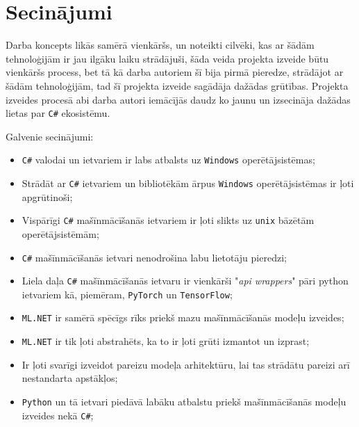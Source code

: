 \section{Secinājumi}

    Darba koncepts likās samērā vienkāršs, un noteikti cilvēki, kas ar šādām tehnoloģijām ir jau
    ilgāku laiku strādājuši, šāda veida projekta izveide būtu vienkāršs process, bet tā kā darba autoriem
    šī bija pirmā pieredze, strādājot ar šādām tehnoloģijām, tad šī projekta izveide sagādāja dažādas
    grūtības. Projekta izveides procesā abi darba autori iemācījās daudz ko jaunu  un izsecināja
    dažādas lietas par \texttt{C\#} ekosistēmu.

    Galvenie secinājumi:
    \begin{itemize}
        \item \texttt{C\#} valodai un ietvariem ir labs atbalsts uz \texttt{Windows} operētājsistēmas;
        \item Strādāt ar \texttt{C\#} ietvariem un bibliotēkām ārpus \texttt{Windows} operētājsistēmas ir ļoti apgrūtinoši;
        \item Vispārīgi \texttt{C\#} mašīnmācīšanās ietvariem ir ļoti slikts uz \texttt{unix} bāzētām operētājsistēmām;
        \item \texttt{C\#} mašīnmācīšanās ietvari nenodrošina labu lietotāju pieredzi;
        \item Liela daļa \texttt{C\#} mašīnmācīšanās ietvaru ir vienkārši "\textit{api wrappers}" pāri python ietvariem kā, piemēram, \texttt{PyTorch} un \texttt{TensorFlow};
        \item \texttt{ML.NET} ir samērā spēcīgs rīks priekš mazu mašīnmācīšanās modeļu izveides;
        \item \texttt{ML.NET} ir tik ļoti abstrahēts, ka to ir ļoti grūti izmantot un izprast;
        \item Ir ļoti svarīgi izveidot pareizu modeļa arhitektūru, lai tas strādātu pareizi arī nestandarta apstākļos;
        \item \texttt{Python} un tā ietvari piedāvā labāku atbalstu priekš mašīnmācīšanās modeļu izveides nekā \texttt{C\#};
    \end{itemize}
